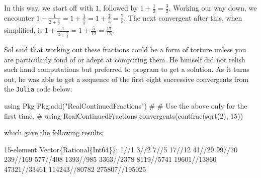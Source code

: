 \documentclass[
  a4paper,
]{article}
\newenvironment{Shaded}{\begin{snugshade}}{\end{snugshade}}
\newcommand{\BuiltInTok}[1]{\textcolor[rgb]{0.80,0.80,0.80}{#1}}
\newcommand{\CommentTok}[1]{\textcolor[rgb]{0.50,0.62,0.50}{#1}}
\newcommand{\DataTypeTok}[1]{\textcolor[rgb]{0.87,0.87,0.75}{#1}}
\newcommand{\FloatTok}[1]{\textcolor[rgb]{0.75,0.75,0.82}{#1}}
\newcommand{\FunctionTok}[1]{\textcolor[rgb]{0.94,0.94,0.56}{#1}}
\newcommand{\ImportTok}[1]{\textcolor[rgb]{0.80,0.80,0.80}{#1}}
\newcommand{\NormalTok}[1]{\textcolor[rgb]{0.80,0.80,0.80}{#1}}
\newcommand{\OperatorTok}[1]{\textcolor[rgb]{0.94,0.94,0.82}{#1}}
\newcommand{\StringTok}[1]{\textcolor[rgb]{0.80,0.58,0.58}{#1}}
\begin{document}
In this way, we start off with \(1\), followed by
\(1 + \frac{1}{2} = \frac{3}{2}\). Working our way down, we encounter
\(1 + \frac{1}{2 + \frac{1}{2}} = 1+\frac{1}{\frac{5}{2}} = 1 + \frac{2}{5} = \frac{7}{5}\).
The next convergent after this, when simplified, is
\(1 + \frac{1}{2+\frac{2}{5}} = 1 + \frac{5}{12} = \frac{17}{12}\).

Sol said that working out these fractions could be a form of torture
unless you are particularly fond of or adept at computing them. He
himself did not relish such hand computations but preferred to program
to get a solution. As it turns out, he was able to get a sequence of the
first eight successive convergents from the \texttt{Julia} code below:

\begin{Shaded}
\begin{Highlighting}[]
\ImportTok{using} \BuiltInTok{Pkg}
\BuiltInTok{Pkg}\NormalTok{.}\FunctionTok{add}\NormalTok{(}\StringTok{"RealContinuedFractions"}\NormalTok{)}
\CommentTok{\#}
\CommentTok{\# Use the above only for the first time.}
\CommentTok{\#}
\ImportTok{using} \BuiltInTok{RealContinuedFractions}
\FunctionTok{convergents}\NormalTok{(}\FunctionTok{contfrac}\NormalTok{(}\FunctionTok{sqrt}\NormalTok{(}\FloatTok{2}\NormalTok{), }\FloatTok{15}\NormalTok{))}
\end{Highlighting}
\end{Shaded}

which gave the following results:

\begin{Shaded}
\begin{Highlighting}[]
\FloatTok{15}\OperatorTok{{-}}\NormalTok{element }\DataTypeTok{Vector}\NormalTok{\{}\DataTypeTok{Rational}\NormalTok{\{}\DataTypeTok{Int64}\NormalTok{\}\}}\OperatorTok{:}
      \FloatTok{1}\OperatorTok{//}\FloatTok{1}
      \FloatTok{3}\OperatorTok{//}\FloatTok{2}
      \FloatTok{7}\OperatorTok{//}\FloatTok{5}
     \FloatTok{17}\OperatorTok{//}\FloatTok{12}
     \FloatTok{41}\OperatorTok{//}\FloatTok{29}
     \FloatTok{99}\OperatorTok{//}\FloatTok{70}
    \FloatTok{239}\OperatorTok{//}\FloatTok{169}
    \FloatTok{577}\OperatorTok{//}\FloatTok{408}
   \FloatTok{1393}\OperatorTok{//}\FloatTok{985}
   \FloatTok{3363}\OperatorTok{//}\FloatTok{2378}
   \FloatTok{8119}\OperatorTok{//}\FloatTok{5741}
  \FloatTok{19601}\OperatorTok{//}\FloatTok{13860}
  \FloatTok{47321}\OperatorTok{//}\FloatTok{33461}
 \FloatTok{114243}\OperatorTok{//}\FloatTok{80782}
 \FloatTok{275807}\OperatorTok{//}\FloatTok{195025}
\end{Highlighting}
\end{Shaded}
\end{document}
